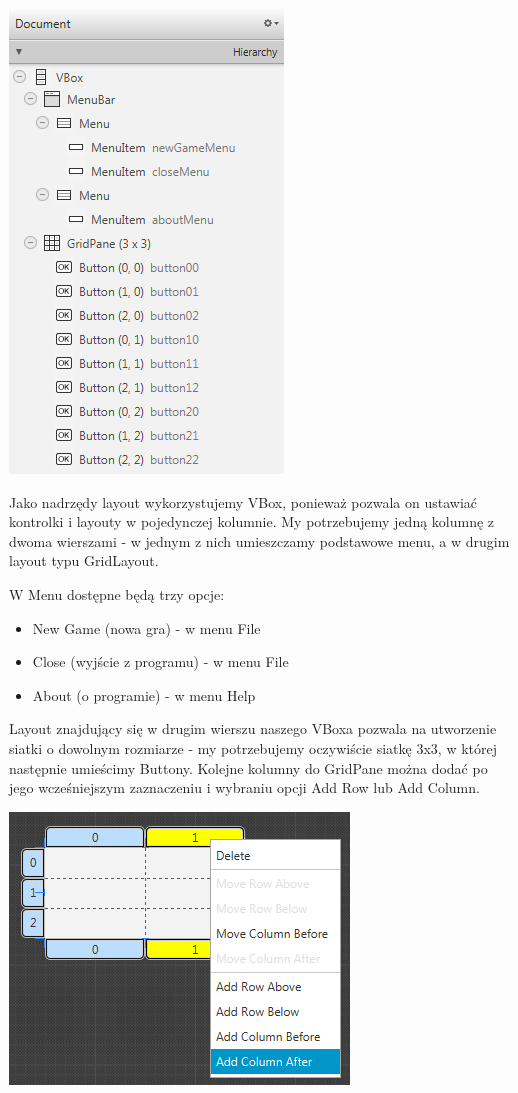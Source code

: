 \documentclass[letterpaper,10pt,english]{sphinxmanual}
\begin{document}
{\hfill\includegraphics{sb_hierarchy.png}\hfill}

Jako nadrzędy layout wykorzystujemy VBox, ponieważ pozwala on ustawiać kontrolki i layouty w pojedynczej kolumnie. My potrzebujemy jedną kolumnę z dwoma wierszami - w jednym z nich umieszczamy podstawowe menu, a w drugim layout typu GridLayout.

W Menu dostępne będą trzy opcje:
\begin{itemize}
\item {} 
New Game (nowa gra) - w menu File

\item {} 
Close (wyjście z programu) - w menu File

\item {} 
About (o programie) - w menu Help

\end{itemize}

Layout znajdujący się w drugim wierszu naszego VBoxa pozwala na utworzenie siatki o dowolnym rozmiarze - my potrzebujemy oczywiście siatkę 3x3, w której następnie umieścimy Buttony. Kolejne kolumny do GridPane można dodać po jego wcześniejszym zaznaczeniu i wybraniu opcji Add Row lub Add Column.

{\hfill\includegraphics{add_column.png}\hfill}
\end{document}
